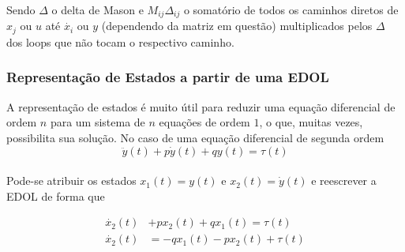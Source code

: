 \documentclass{article}
\numberwithin{equation}{section}
\begin{document}
Sendo $\Delta$ o delta de Mason e $M_{ij}\Delta_{ij}$ o somatório de todos os caminhos diretos de $x_{j}$ ou $u$ até $\dot{x_{i}}$ ou $y$ (dependendo da matriz em questão) multiplicados pelos $\Delta$ dos loops que não tocam o respectivo caminho.

\subsubsection{Representação de Estados a partir de uma EDOL}
\label{subsubsec:est_edol}
A representação de estados é muito útil para reduzir uma equação diferencial de ordem $n$ para um sistema de $n$ equações de ordem $1$, o que, muitas vezes, possibilita sua solução. No caso de uma equação diferencial de segunda ordem
\begin{equation*}
    \ddot{y}(t)+p\dot{y}(t)+qy(t)=\tau(t)
\end{equation*} \\
Pode-se atribuir os estados $x_{1}(t)=y(t)$ e $x_{2}(t)=\dot{y}(t)$ e reescrever a EDOL de forma que

\begin{equation*}
    \begin{split}
        \dot{x_2}(t)&+px_{2}(t)+qx_{1}(t)=\tau(t) \\
        \dot{x_2}(t)&=-qx_{1}(t)-px_{2}(t)+\tau(t)
    \end{split}
\end{equation*}
\end{document}
